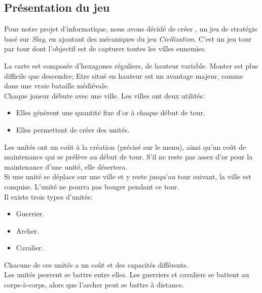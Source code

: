 \documentclass[french]{article}
\title{\textgoth{Slay and Conquer}}
\author{Paul Boursin \and David Hamelin \and Simon Pellicer \and Hugo Spinat}
\date{5 mai 2019}
\begin{document}
\maketitle
\tableofcontents

\subsection{Présentation du jeu}

Pour notre projet d'informatique, nous avons décidé de créer , un jeu de stratégie basé sur \textit{Slay}, en ajoutant des mécaniques du jeu \textit{Civilization}.  C'est un jeu tour par tour dont l'objectif est de capturer toutes les villes ennemies.

La carte est composée d'hexagones réguliers, de hauteur variable. Monter est plus difficile que descendre; Etre situé en hauteur est un avantage majeur, comme dans une vraie bataille médiévale. \\

Chaque joueur débute avec une ville. Les villes ont deux utilités:
\begin{itemize}
	\item Elles génèrent une quantité fixe d'or à chaque début de tour.
	\item Elles permettent de créer des unités.
\end{itemize}

Les unités ont un coût à la création (précisé sur le menu), ainsi qu'un coût de maintenance qui se prélève au début de tour.
S'il ne reste pas assez d'or pour la maintenance d'une unité, elle désertera.\\

Si une unité se déplace sur une ville et y reste jusqu'au tour suivant, la ville est conquise. L'unité ne pourra pas bouger pendant ce tour.\\

Il existe trois types d'unités:

\begin{itemize}
	\item Guerrier.
	\item Archer.
	\item Cavalier.
\end{itemize}

Chacune de ces unités a un coût et des capacités différents.\\

Les unités peuvent se battre entre elles. Les guerriers et cavaliers se battent au corps-à-corps, alors que l'archer peut se battre à distance.\\
\end{document}
